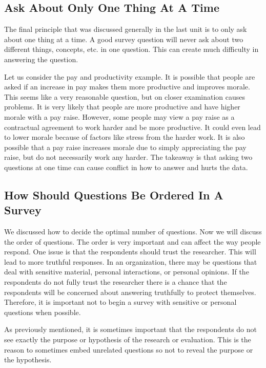 \documentclass[]{book}
\theoremstyle{definition}
\theoremstyle{definition}
\theoremstyle{definition}
\theoremstyle{remark}
\begin{document}
\hypertarget{ask-about-only-one-thing-at-a-time}{%
\subsection{Ask About Only One Thing At A
Time}\label{ask-about-only-one-thing-at-a-time}}

The final principle that was discussed generally in the last unit is to
only ask about one thing at a time. A good survey question will never
ask about two different things, concepts, etc. in one question. This can
create much difficulty in answering the question.

Let us consider the pay and productivity example. It is possible that
people are asked if an increase in pay makes them more productive and
improves morale. This seems like a very reasonable question, but on
closer examination causes problems. It is very likely that people are
more productive and have higher morale with a pay raise. However, some
people may view a pay raise as a contractual agreement to work harder
and be more productive. It could even lead to lower morale because of
factors like stress from the harder work. It is also possible that a pay
raise increases morale due to simply appreciating the pay raise, but do
not necessarily work any harder. The takeaway is that asking two
questions at one time can cause conflict in how to answer and hurts the
data.

\hypertarget{how-should-questions-be-ordered-in-a-survey}{%
\subsection{How Should Questions Be Ordered In A
Survey}\label{how-should-questions-be-ordered-in-a-survey}}

We discussed how to decide the optimal number of questions. Now we will
discuss the order of questions. The order is very important and can
affect the way people respond. One issue is that the respondents should
trust the researcher. This will lead to more truthful responses. In an
organization, there may be questions that deal with sensitive material,
personal interactions, or personal opinions. If the respondents do not
fully trust the researcher there is a chance that the respondents will
be concerned about answering truthfully to protect themselves.
Therefore, it is important not to begin a survey with sensitive or
personal questions when possible.

As previously mentioned, it is sometimes important that the respondents
do not see exactly the purpose or hypothesis of the research or
evaluation. This is the reason to sometimes embed unrelated questions so
not to reveal the purpose or the hypothesis.
\end{document}
